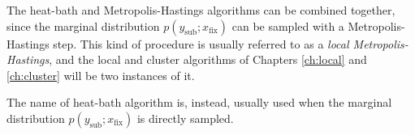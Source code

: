 The heat-bath and Metropolis-Hastings algorithms can be combined together,
since the marginal distribution $p(y_\mathrm{sub};x_\mathrm{fix})$ can be sampled with a Metropolis-Hastings step.
This kind of procedure is usually referred to as a \emph{local Metropolis-Hastings},
and the local and cluster algorithms of Chapters \ref{ch:local} and \ref{ch:cluster} will be two instances of it.

The name of heat-bath algorithm is, instead, usually used when the marginal distribution $p(y_\mathrm{sub};x_\mathrm{fix})$ is directly sampled.

